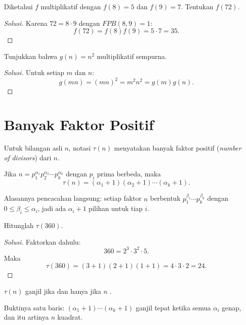 \documentclass[12pt]{scrartcl}
\begin{document}
\begin{example}
Diketahui $f$ multiplikatif dengan $f(8) = 5$ dan $f(9) = 7$.
Tentukan $f(72)$.
\end{example}
\begin{proof}[Solusi]
Karena $72 = 8 \cdot 9$ dengan $FPB(8, 9) = 1$:
\[ f(72) = f(8)f(9) = 5 \cdot 7 = 35. \]
\end{proof}

\begin{example}
Tunjukkan bahwa $g(n) = n^2$ multiplikatif sempurna.
\end{example}
\begin{proof}[Solusi]
Untuk setiap $m$ dan $n$:
\[ g(mn) = (mn)^2 = m^2n^2 = g(m)g(n). \]
\end{proof}

\section{Banyak Faktor Positif}

\begin{definition}
Untuk bilangan asli $n$, notasi $\tau(n)$ menyatakan banyak faktor positif
(\textit{number of divisors}) dari $n$.
\end{definition}

\begin{theorem}
Jika $n = p_1^{\alpha_1} p_2^{\alpha_2} \cdots p_k^{\alpha_k}$ dengan $p_i$ prima berbeda, maka
\[ \tau(n) = (\alpha_1 + 1)(\alpha_2 + 1) \cdots (\alpha_k + 1). \]
\end{theorem}

Alasannya pencacahan langsung: setiap faktor $n$ berbentuk
$p_1^{\beta_1} \cdots p_k^{\beta_k}$ dengan $0 \le \beta_i \le \alpha_i$,
jadi ada $\alpha_i + 1$ pilihan untuk tiap $i$.

\begin{example}
Hitunglah $\tau(360)$.
\end{example}
\begin{proof}[Solusi]
Faktorkan dahulu:
\[ 360 = 2^3 \cdot 3^2 \cdot 5. \]
Maka
\[ \tau(360) = (3 + 1)(2 + 1)(1 + 1) = 4 \cdot 3 \cdot 2 = 24. \]
\end{proof}

\begin{fact}
$\tau(n)$ ganjil jika dan hanya jika $n$ .
\end{fact}

Buktinya satu baris: $(\alpha_1 + 1) \cdots (\alpha_k + 1)$ ganjil tepat ketika
semua $\alpha_i$ genap, dan itu artinya $n$ kuadrat.
\end{document}
